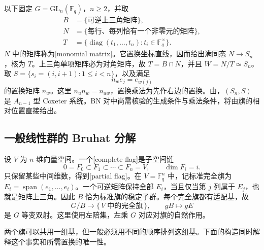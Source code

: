 \ProseParagraphBreak
以下固定 \(G=\mathrm{GL}_n(\mathbb F_q)\)，\(n\ge2\)，并取
\[
	\begin{aligned}
		B&=\{\text{可逆上三角矩阵}\},\\
		N&=\{\text{每行、每列恰有一个非零元的矩阵}\},\\
		T&=\{\operatorname{diag}(t_1,\ldots,t_n):t_i\in\mathbb F_q^\times\}.
	\end{aligned}
\]
\(N\) 中的矩阵称为[monomial matrix]。它置换坐标直线，因而给出满同态 \(N\to S_n\)，核为 \(T\)。上三角单项矩阵必为对角矩阵，故 \(T=B\cap N\)，并且 \(W=N/T\simeq S_n\)。取 \(S=\{s_i=(i,i+1):1\le i<n\}\)，以及满足
\[
	n_we_j=e_{w(j)}
\]
的置换矩阵 \(n_w\)。这里 \(n_un_w=n_{uw}\)，置换乘法为先作右边的置换。由，\((S_n,S)\) 是 \(A_{n-1}\) 型 Coxeter 系统。BN 对中尚需核验的生成条件与乘法条件，将由旗的相对位置直接给出。

\subsection{一般线性群的 Bruhat 分解}
\label{b5:subsec:F02:02}

设 \(V\) 为 \(n\) 维向量空间。一个[complete flag]是子空间链
\[
	0=F_0\subset F_1\subset\cdots\subset F_n=V,
	\qquad \dim F_i=i.
\]
只保留某些中间维数，得到[partial flag]。在 \(V=\mathbb F_q^n\) 中，记标准完全旗为 \(E_i=\operatorname{span}(e_1,\ldots,e_i)\)。一个可逆矩阵保持全部 \(E_i\)，当且仅当第 \(j\) 列属于 \(E_j\)，也就是矩阵上三角。因此 \(B\) 恰为标准旗的稳定子群。每个完全旗都有适配基，故
\[
	G/B\longrightarrow\{\,V\;\text{中的完全旗}\,\},\qquad gB\longmapsto gE
\]
是 \(G\) 等变双射。这里使用左陪集，左乘 \(G\) 对应对旗的自然作用。

两个旗可以共用一组基，但一般必须用不同的顺序排列这组基。下面的构造同时解释这个事实和所需置换的唯一性。

